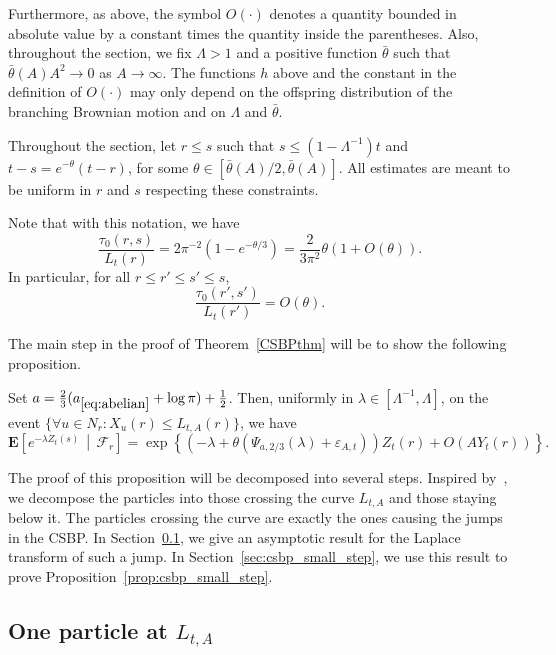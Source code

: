 \documentclass[10pt]{amsart}
\theoremstyle{definition}\newtheorem{defi}[theo]{Definition}\newtheorem{rema}[theo]{Remark}\newtheorem{exam}[theo]{Example}\newtheorem{exem}[theo]{Example}\newtheorem{nota}[theo]{Notation}
\newcommand*\eps{\varepsilon}
\newcommand*\E{\mathbf{E}}
\newcommand\F{\mathcal{F}}
\newcommand{\1} {\mathds{1}}
\renewcommand*\to{\rightarrow}
\let\oldforall\forall
\renewcommand*{\forall}{\mathrel{\oldforall}}
\begin{document}
Furthermore, as above, the symbol $O(\cdot)$ denotes a quantity bounded in absolute value by a constant times the quantity inside the parentheses. Also, throughout the section, we fix $\Lambda > 1$ and a positive function $\bar\theta$ such that $\bar\theta(A)A^2\to 0$ as $A\to\infty$. The functions $h$ above and the constant in the definition of $O(\cdot)$ may only depend on the offspring distribution of the branching Brownian motion and on $\Lambda$ and $\bar{\theta}$.

Throughout the section, let $r\le s$ such that $s\le (1-\Lambda^{-1})t$ and $t-s=e^{-\theta}(t-r)$, for some $\theta\in [\bar\theta(A)/2,\bar\theta(A)]$. All estimates are meant to be uniform in $r$ and $s$ respecting these constraints.

Note that with this notation, we have
\begin{equation}\label{26}
\frac{\tau_0(r,s) }{ L_t(r)} =2\pi^{-2} \left(1-e^{-\theta/3}\right) = \frac2{3\pi^{2}}\theta \left(1 + O(\theta)\right).
\end{equation}
In particular, for all $r\le r'\le s'\le s$,
\begin{equation}\label{27}
\frac{\tau_0\left(r',s'\right) }{ L_t(r')} =O(\theta).
\end{equation}

The main step in the proof of Theorem~\ref{CSBPthm} will be to show the following proposition.

\begin{prop}\label{prop:csbp_small_step}
Set $a=\frac{2}{3}(a_{\eqref{eq:abelian}}+\log \pi)+\frac{1}{2}$. Then, uniformly in $\lambda\in [\Lambda^{-1},\Lambda]$, on the event $\{\forall u\in N_r: X_u(r) \le L_{t,A}(r)\}$, we have
\[
\E\left[e^{-\lambda Z_t(s)}\,\middle|\,\F_r\right] = \exp\left\{\left(-\lambda + \theta \left(\Psi_{a,2/3}(\lambda)+\eps_{A,t}\right)\right)Z_t(r) + O\left(AY_t(r)\right)\right\}.
\]
\end{prop}

The proof of this proposition will be decomposed into several steps. Inspired by~\cite{bbs2}, we decompose the particles into those crossing the curve $L_{t,A}$ and those staying below it. The particles crossing the curve are exactly the ones causing the jumps in the CSBP. In Section~\ref{sec:csbp_jump}, we give an asymptotic result for the Laplace transform of such a jump. In Section~\ref{sec:csbp_small_step}, we use this result to prove Proposition~\ref{prop:csbp_small_step}.

\subsection{One particle at \texorpdfstring{$L_{t,A}$}{L\_\{t,A\}}}\label{sec:csbp_jump}
\end{document}
